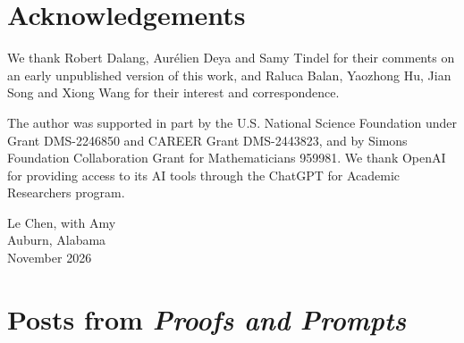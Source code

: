 \section*{Acknowledgements}

We thank Robert Dalang, Aur\'elien Deya and Samy Tindel for their comments on
an early unpublished version of this work, and Raluca Balan, Yaozhong Hu, Jian
Song and Xiong Wang for their interest and correspondence.

The author was supported in part by the U.S. National Science Foundation under
Grant \mbox{DMS-2246850} and CAREER Grant \mbox{DMS-2443823}, and by Simons
Foundation Collaboration Grant for Mathematicians 959981. We thank OpenAI for
providing access to its AI tools through the ChatGPT for Academic Researchers
program.

\medskip
\begin{flushright}
Le Chen, with Amy\\
Auburn, Alabama\\
November 2026
\end{flushright}

\section*{Posts from \emph{Proofs and Prompts}}

